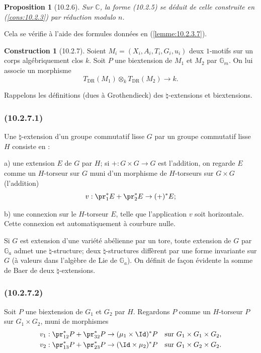 \documentclass[12pt,a4paper]{amsart}
\theoremstyle{plain}
\newtheorem{proposition}[lemme]{Proposition}
\theoremstyle{definition}
\newtheorem{construction}[lemme]{Construction}
\theoremstyle{remark}
\numberwithin{equation}{section}
\begin{document}
\begin{proposition}[10.2.6]\label{prop:10.2.6}
Sur $\mathbb{C}$, la forme (10.2.5) se déduit de celle construite en (\ref{cons:10.2.3}) par réduction modulo $n$.
\end{proposition}

Cela se vérifie à l'aide des formules données en (\ref{lemme:10.2.3.7}).

\begin{construction}[10.2.7]\label{cons:10.2.7}
Soient $M_i=(X_i,A_i,T_i,G_i,u_i)$ deux $1$-motifs sur un corps algébriquement clos $k$. Soit $P$ une biextension de $M_1$ et $M_2$ par $\mathbb{G}_m$. On lui associe un morphisme
\[
T_\mathrm{DR}(M_1)\otimes_k T_\mathrm{DR}(M_2)\to k.
\]
\end{construction}

Rappelons les définitions (dues à Grothendieck) des $\natural$-extensions et biextensions.

\subsubsection*{(10.2.7.1)}
Une $\natural$-extension d'un groupe commutatif lisse $G$ par un groupe commutatif lisse $H$ consiste en :

a) une extension $E$ de $G$ par $H$; si $+:G\times G\to G$ est l'addition, on regarde $E$ comme un $H$-torseur sur $G$ muni d'un morphisme de $H$-torseurs sur $G\times G$ (l'addition)
\[
v:\pr_1^*E+\pr_2^*E\to(+)^*E;
\]

b) une connexion sur le $H$-torseur $E$, telle que l'application $v$ soit horizontale. Cette connexion est automatiquement à courbure nulle.

Si $G$ est extension d'une variété abélienne par un tore, toute extension de $G$ par $\mathbb{G}_a$ admet une $\natural$-structure; deux $\natural$-structures diffèrent par une forme invariante sur $G$ (à valeurs dans l'algèbre de Lie de $\mathbb{G}_a$). On définit de façon évidente la somme de Baer de deux $\natural$-extensions.

\subsubsection*{(10.2.7.2)}
Soit $P$ une biextension de $G_1$ et $G_2$ par $H$. Regardons $P$ comme un $H$-torseur $P$ sur $G_1\times G_2$, muni de morphismes
\begin{align*}
v_1 &: \pr_{12}^*P+\pr_{32}^*P\to(\mu_1\times\Id)^*P &&\text{sur }G_1\times G_1\times G_2, \\
v_2 &: \pr_{13}^*P+\pr_{23}^*P\to(\Id\times\mu_2)^*P &&\text{sur }G_1\times G_2\times G_2.
\end{align*}
\end{document}
